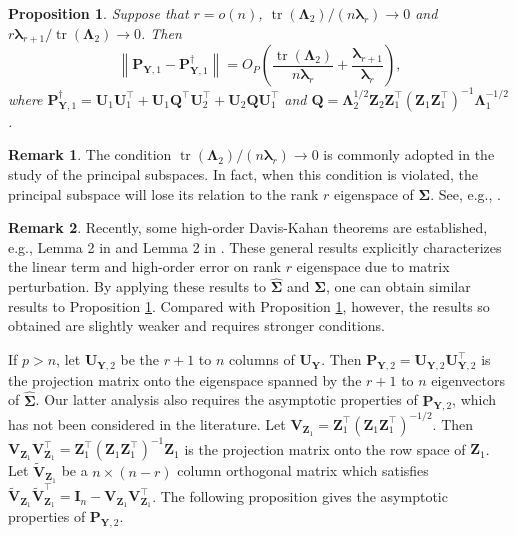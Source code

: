 \documentclass[12pt]{article} %
\DeclareMathOperator{\mytr}{tr}
\newcommand{\bQ}{\mathbf{Q}}
\newcommand{\bZ}{\mathbf{Z}}
\newcommand{\bP}{\mathbf{P}}
\newcommand{\bY}{\mathbf{Y}}
\newcommand{\bI}{\mathbf{I}}
\newcommand{\bU}{\mathbf{U}}
\newcommand{\bV}{\mathbf{V}}
\newcommand{\bfsym}[1]{\ensuremath{\boldsymbol{#1}}}
\def\blambda {\bfsym {\lambda}}
\def\bLambda {\bfsym {\Lambda}}
\def\bSigma {\bfsym {\Sigma}}
\newtheorem{proposition}{Proposition}
\theoremstyle{definition}
\newtheorem{remark}{Remark}
\begin{document}
\begin{proposition}\label{newEigenvectorPropCor}
    Suppose that $r=o(n)$, $\mytr(\bLambda_2)/(n\blambda_r)\to 0$ and $r \blambda_{r+1}/\mytr(\bLambda_2)\to 0$. Then
    \begin{equation*}
        \left\|\bP_{\bY,1} - 
        \bP_{\bY,1}^{\dagger}\right\|
        =O_P\left(\frac{\mytr(\bLambda_2)}{n\blambda_r}+\frac{\blambda_{r+1}}{\blambda_r}\right),
    \end{equation*}
where
$
\bP_{\bY,1}^{\dagger}
=\bU_1 \bU_1^\top + \bU_1 \bQ^\top \bU_2^\top
            +\bU_2 \bQ \bU_1^\top
            $ and 
$\bQ
       =
       \bLambda_2^{1/2} \bZ_2 \bZ_1^\top (\bZ_1 \bZ_1^\top)^{-1} \bLambda_1^{-1/2}
       $.
\end{proposition}
\begin{remark}
    The condition $\mytr(\bLambda_2)/(n\blambda_r)\to 0$ is commonly adopted in the study of the principal subspaces.
    In fact, when this condition is violated, the principal subspace will lose its relation to the rank $r$ eigenspace of $\bSigma$. See, e.g., \cite{Nadler2009Finite}.
\end{remark}
\begin{remark}
    Recently, some high-order Davis-Kahan theorems are established, e.g., Lemma 2 in \cite{koltchinskii2016} and Lemma 2 in \cite{fan2017Dist}.
    These general results explicitly characterizes the linear term and high-order error on rank $r$ eigenspace due to matrix perturbation.
    By applying these results to $\hat{\bSigma}$ and $\bSigma$, one can obtain similar results to Proposition \ref{newEigenvectorPropCor}.
    Compared with Proposition \ref{newEigenvectorPropCor},
    however, the results so obtained are slightly weaker and requires stronger conditions. 
\end{remark}

If $p>n$, let $\bU_{\bY,2}$ be the $r+1$ to $n$ columns of $\bU_{\bY}$.
Then $\bP_{\bY,2}=\bU_{\bY,2}\bU_{\bY,2}^\top$ is the projection matrix onto the eigenspace spanned by the $r+1$ to $n$ eigenvectors of $\hat{\bSigma}$.
Our latter analysis also requires the asymptotic properties of $\bP_{\bY,2}$, which has not been considered in the literature.
    Let $\bV_{\bZ_1}=\bZ_1^\top (\bZ_1 \bZ_1^\top)^{-1/2}$.
    Then $\bV_{\bZ_1}\bV_{\bZ_1}^\top=\bZ_1^\top (\bZ_1 \bZ_1^\top)^{-1}\bZ_1$ is the projection matrix onto the row space of $\bZ_1$.
    Let $\tilde{\bV}_{\bZ_1}$ be a $n\times (n-r)$ column orthogonal matrix which satisfies $\tilde{\bV}_{\bZ_1}\tilde{\bV}_{\bZ_1}^\top= \bI_{n}-\bV_{\bZ_1}\bV_{\bZ_1}^\top$.
    The following proposition gives the asymptotic properties of $\bP_{\bY,2}$.
\end{document}
